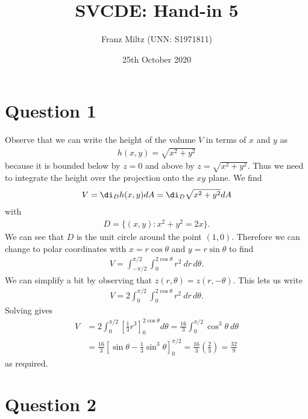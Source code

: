 \documentclass{article}
\begin{document}
\title{SVCDE: Hand-in 5}
\author{Franz Miltz (UNN: S1971811)}
\date{25th October 2020}
\maketitle


\section*{Question 1}


Observe that we can write the height of the volume $V$ in terms of $x$ and $y$ as
\begin{align*}
  h(x,y) = \sqrt{x^2 + y^2}
\end{align*}
because it is bounded below by $z=0$ and above by $z=\sqrt{x^2 + y^2}$.
Thus we need to integrate the height over the projection onto the $xy$ plane. We find
\begin{align*}
  V = \di_D h(x,y)dA = \di_D \sqrt{x^2+y^2}dA
\end{align*}
with
\begin{align*}
  D = \{(x,y) : x^2 + y^2 = 2x\}.
\end{align*}
We can see that $D$ is the unit circle around the point $(1,0)$. Therefore we can
change to polar coordinates with $x=r\cos\theta$ and $y=r\sin\theta$ to find
\begin{align*}
  V = \int_{-\pi/2}^{\pi/2}\int_0^{2\cos\theta} r^2\: dr\,d\theta.
\end{align*}
We can simplify a bit by observing that $z(r,\theta)=z(r,-\theta)$. This lets us write
\begin{align*}
  V = 2\int_{0}^{\pi/2}\int_0^{2\cos \theta} r^2\: dr\,d\theta.
\end{align*}
Solving gives
\begin{align*}
  V & = 2\int_0^{\pi/2}\left[\frac{1}{3}r^3\right]_0^{2\cos \theta}d\theta
  =\frac{16}{3}\int_0^{\pi/2}\cos^3 \theta\:d\theta                              \\
    & =\frac{16}{3}\left[\sin \theta - \frac{1}{3}\sin^3 \theta\right]_0^{\pi/2}
  =\frac{16}{3}\left(\frac{2}{3}\right) = \frac{32}{9}
\end{align*}
as required.


\section*{Question 2}
\end{document}
